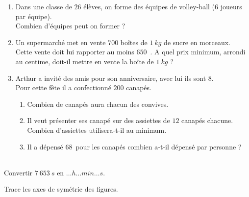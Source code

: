 \documentclass[10pt,openany]{book}
\begin{document}
\begin{enumerate}
\item Dans une classe de $26$ \'el\`eves, on forme des \'equipes de volley-ball ($6$ joueurs par \'equipe).\\
Combien d'\'equipes peut on former ?

\item Un supermarch\'e met en vente $700$ bo\^ites de $1~kg$ de sucre en morceaux.\\
Cette vente doit lui rapporter au moins $650$~\eurosans.
A quel prix minimum, arrondi au centime, doit-il mettre en vente la bo\^ite de $1~kg$ ?

\item Arthur a invit\'e des amis pour son anniversaire, avec lui ils sont $8$.\\
Pour cette f\^ete il a confectionn\'e $200$ canap\'es.\\
\begin{enumerate}
\item Combien de canap\'es aura chacun des convives.
\item Il veut pr\'esenter ses canap\'e sur des assiettes de $12$ canap\'es chacune.\\
Combien d'assiettes utilisera-t-il au minimum.
\item Il a d\'epens\'e $68$~\eurosans pour les canap\'es combien a-t-il d\'epens\'e par personne ?

\end{enumerate}

\end{enumerate}

\\
Convertir $7~653~s$ en $\ldots h \ldots min \ldots s$.

 Trace les axes de sym\'etrie des figures.\\ 
\fontsize{36}{16}\selectfont{}\quad{}\quad{}\quad{}\quad{}\quad{}\normalsize
\end{document}
